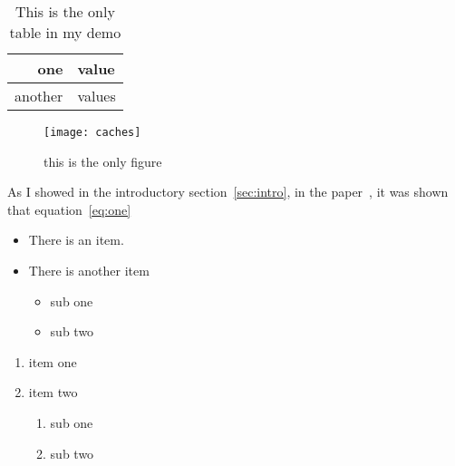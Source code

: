 \documentclass{artikel3}
\begin{document}
\begin{table}[ht]
  \centering
  \begin{tabular}{|rl|}
    \hline one&value \\ \hline another&values \\ \hline
  \end{tabular}
  \caption{This is the only table in my demo}
  \label{tab:thetable}
\end{table}
\begin{figure}[ht]
  \centering
  \texttt{[image: caches]}
  \caption{this is the only figure}
  \label{fig:thefigure}
\end{figure}
As I showed in the introductory section~\ref{sec:intro}, in the
paper~\cite{AdJo:colorblind}, it was shown that
equation~\eqref{eq:one}
\begin{itemize}
\item There is an item.
\item There is another item
  \begin{itemize}
  \item sub one
  \item sub two
  \end{itemize}
\end{itemize}
\begin{enumerate}
\item item one
\item item two
  \begin{enumerate}
  \item sub one
  \item sub two
  \end{enumerate}
\end{enumerate}

\tableofcontents
\listoffigures



\end{document}
